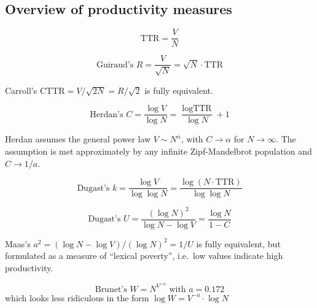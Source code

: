 \documentclass[a4paper]{article}
\begin{document}
\subsection{Overview of productivity measures}
\label{sec:prod:measures}

\begin{equation}
  \label{eq:prod:ttr}
  \text{TTR} = \frac{V}{N}
\end{equation}

\begin{equation}
  \label{eq:prod:guiraud-R}
  \text{Guiraud's } R = \frac{V}{\sqrt{N}} = \sqrt{N} \cdot \text{TTR}
\end{equation}

Carroll's $\text{CTTR} = V / \sqrt{2 N} = R / \sqrt{2}$ is fully equivalent.

\begin{equation}
  \label{eq:prod:herdan-C}
  \text{Herdan's } C = \frac{\log V}{\log N} = \frac{\log \text{TTR}}{\log N} + 1 
\end{equation}

Herdan assumes the general power law $V\sim N^{\alpha}$, with $C\to \alpha$
for $N\to \infty$. The assumption is met approximately by any infinite
Zipf-Mandelbrot population and $C\to 1/a$.

\begin{equation}
  \label{eq:prod:dugast-k}
  \text{Dugast's } k = \frac{\log V}{\log \log N}
  = \frac{\log(N \cdot \text{TTR})}{\log \log N}
\end{equation}

\begin{equation}
  \label{eq:prod:dugast-U}
  \text{Dugast's } U = \frac{(\log N)^2}{\log N - \log V}
  = \frac{\log N}{1 - C}
\end{equation}

Maas's $a^2 = (\log N - \log V) / (\log N)^2 = 1 / U$ is fully equivalent, but
formulated as a measure of ``lexical poverty'', i.e.\ low values indicate high
productivity.


\begin{equation}
  \label{eq:prod:brunet-W}
  \text{Brunet's } W = N^{V^{-a}} \text{ with } a = 0.172
\end{equation}
which looks less ridiculous in the form $\log W = V^{-a}\cdot \log N$
\end{document}
